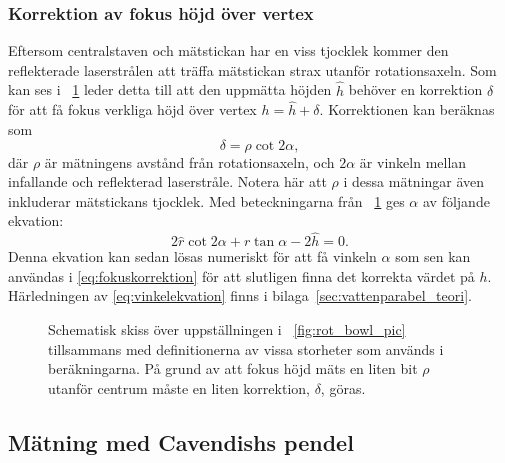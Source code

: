 \documentclass[11pt,a4paper]{article}
\newcommand{\figref}{\figurename~\ref}
\begin{document}
\subsubsection{Korrektion av fokus höjd över vertex} \label{sec:vattenparabel_korrektion}
Eftersom centralstaven och mätstickan har en viss tjocklek kommer den reflekterade laserstrålen att träffa mätstickan strax utanför rotationsaxeln. Som kan ses i \figref{fig:rot_bowl} leder detta till att den uppmätta höjden $\hat{h}$ behöver en korrektion $\delta$ för att få fokus verkliga höjd över vertex $h=\hat{h}+\delta$. Korrektionen kan beräknas som 
\begin{equation}\label{eq:fokuskorrektion}
\delta = \rho\cot{2\alpha},
\end{equation}
där $\rho$ är mätningens avstånd från rotationsaxeln, och $2\alpha$ är vinkeln mellan infallande och reflekterad laserstråle. Notera här att $\rho$ i dessa mätningar även inkluderar mätstickans tjocklek. Med beteckningarna från \figref{fig:rot_bowl} ges $\alpha$ av följande ekvation:
\begin{equation}\label{eq:vinkelekvation}
2\hat{r}\cot{2\alpha}+r\tan{\alpha}-2\hat{h}=0.
\end{equation}
Denna ekvation kan sedan lösas numeriskt för att få vinkeln $\alpha$ som sen kan användas i \eqref{eq:fokuskorrektion} för att slutligen finna det korrekta värdet på $h$. Härledningen av \eqref{eq:vinkelekvation} finns i bilaga~\ref{sec:vattenparabel_teori}. 

\begin{figure}
\centering
\resizebox{.7 \textwidth}{!}{}
\caption{\label{fig:rot_bowl} Schematisk skiss över uppställningen i \figref{fig:rot_bowl_pic} tillsammans med definitionerna av vissa storheter som används i beräkningarna. På grund av att fokus höjd mäts en liten bit $\rho$ utanför centrum måste en liten korrektion, $\delta$, göras.  }
\end{figure}











\subsection{Mätning med Cavendishs pendel}
\end{document}
